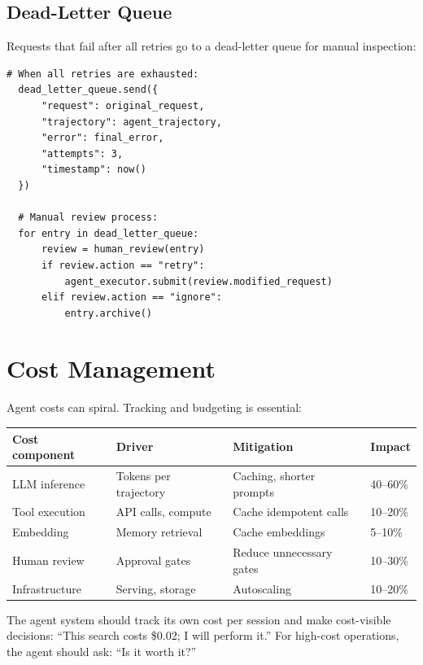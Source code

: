 \subsection{Dead-Letter Queue}

Requests that fail after all retries go to a dead-letter queue for manual inspection:

\begin{lstlisting}[caption=Dead-letter queue processing]
  # When all retries are exhausted:
  dead_letter_queue.send({
      "request": original_request,
      "trajectory": agent_trajectory,
      "error": final_error,
      "attempts": 3,
      "timestamp": now()
  })

  # Manual review process:
  for entry in dead_letter_queue:
      review = human_review(entry)
      if review.action == "retry":
          agent_executor.submit(review.modified_request)
      elif review.action == "ignore":
          entry.archive()
\end{lstlisting}

\section{Cost Management}

Agent costs can spiral. Tracking and budgeting is essential:

\begin{longtable}{p{3cm}p{4cm}p{4cm}p{3cm}}
	\toprule
	\textbf{Cost component} & \textbf{Driver}       & \textbf{Mitigation}      & \textbf{Impact} \\
	\midrule
	LLM inference           & Tokens per trajectory & Caching, shorter prompts & 40--60\%        \\
	Tool execution          & API calls, compute    & Cache idempotent calls   & 10--20\%        \\
	Embedding               & Memory retrieval      & Cache embeddings         & 5--10\%         \\
	Human review            & Approval gates        & Reduce unnecessary gates & 10--30\%        \\  %
	Infrastructure          & Serving, storage      & Autoscaling              & 10--20\%        \\
	\bottomrule
\end{longtable}

\begin{principle}
	The agent system should track its own cost per session and make cost-visible decisions: ``This search costs \$0.02; I will perform it.'' For high-cost operations, the agent should ask: ``Is it worth it?''
\end{principle}

